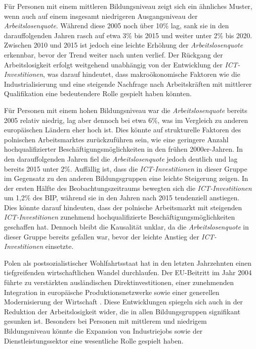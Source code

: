 Für Personen mit einem mittleren Bildungsniveau zeigt sich ein ähnliches Muster, wenn 
auch auf einem insgesamt niedrigeren Ausgangsniveau der \textit{Arbeitslosenquote}. 
Während diese 2005 noch über 10\% lag, sank sie in den darauffolgenden Jahren rasch auf 
etwa 3\% bis 2015 und weiter unter 2\% bis 2020. Zwischen 2010 und 2015 ist jedoch eine 
leichte Erhöhung der \textit{Arbeitslosenquote} erkennbar, bevor der Trend weiter nach 
unten verlief. Der Rückgang der Arbeitslosigkeit erfolgt weitgehend unabhängig von der 
Entwicklung der \textit{\ac{ICT}-Investitionen}, was darauf hindeutet, dass 
makroökonomische Faktoren wie die Industrialisierung und eine steigende Nachfrage 
nach Arbeitskräften mit mittlerer Qualifikation eine bedeutendere Rolle gespielt 
haben könnten.

Für Personen mit einem hohen Bildungsniveau war die \textit{Arbeitslosenquote} bereits 
2005 relativ niedrig, lag aber dennoch bei etwa 6\%, was im Vergleich zu anderen 
europäischen Ländern eher hoch ist. Dies könnte auf strukturelle Faktoren des 
polnischen Arbeitsmarktes zurückzuführen sein, wie eine geringere Anzahl 
hochqualifizierter Beschäftigungsmöglichkeiten in den frühen 2000er-Jahren. In den 
darauffolgenden Jahren fiel die \textit{Arbeitslosenquote} jedoch deutlich und lag 
bereits 2015 unter 2\%. Auffällig ist, dass die \textit{\ac{ICT}-Investitionen} in dieser 
Gruppe im Gegensatz zu den anderen Bildungsgruppen eine leichte Steigerung zeigen. 
In der ersten Hälfte des Beobachtungszeitraums bewegten sich die 
\textit{\ac{ICT}-Investitionen} um 1,2\% des BIP, während sie in den Jahren nach 
2015 tendenziell anstiegen. Dies könnte darauf hindeuten, dass der polnische 
Arbeitsmarkt mit steigenden \textit{\ac{ICT}-Investitionen} zunehmend hochqualifizierte 
Beschäftigungsmöglichkeiten geschaffen hat. Dennoch bleibt die Kausalität unklar, 
da die \textit{Arbeitslosenquote} in dieser Gruppe bereits gefallen war, bevor der 
leichte Anstieg der \textit{\ac{ICT}-Investitionen} einsetzte.

Polen als postsozialistischer Wohlfahrtsstaat hat in den letzten Jahrzehnten einen 
tiefgreifenden wirtschaftlichen Wandel durchlaufen. Der EU-Beitritt im Jahr 2004 
führte zu verstärkten ausländischen Direktinvestitionen, einer zunehmenden 
Integration in europäische Produktionsnetzwerke sowie einer generellen 
Modernisierung der Wirtschaft \parencite[vgl.][S. 186–189]{myant2013transition}. Diese 
Entwicklungen spiegeln sich auch in der Reduktion der Arbeitslosigkeit wider, die in 
allen Bildungsgruppen signifikant gesunken ist. Besonders bei Personen mit mittlerem 
und niedrigem Bildungsniveau könnte die Expansion von Industriejobs sowie der 
Dienstleistungssektor eine wesentliche Rolle gespielt haben.

